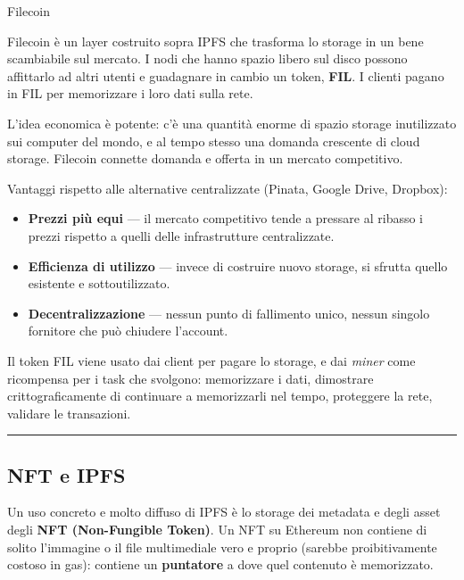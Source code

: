 \documentclass[
  italian,
  openany]{book}
\providecommand{\tightlist}{%
  \setlength{\itemsep}{0pt}\setlength{\parskip}{0pt}}
\begin{document}
\begin{calloutdefinition}{Filecoin}

Filecoin è un layer costruito sopra IPFS che trasforma lo storage in un
bene scambiabile sul mercato. I nodi che hanno spazio libero sul disco
possono affittarlo ad altri utenti e guadagnare in cambio un token,
\textbf{FIL}. I clienti pagano in FIL per memorizzare i loro dati sulla
rete.

\end{calloutdefinition}

L'idea economica è potente: c'è una quantità enorme di spazio storage
inutilizzato sui computer del mondo, e al tempo stesso una domanda
crescente di cloud storage. Filecoin connette domanda e offerta in un
mercato competitivo.

Vantaggi rispetto alle alternative centralizzate (Pinata, Google Drive,
Dropbox):

\begin{itemize}
\tightlist
\item
  \textbf{Prezzi più equi} --- il mercato competitivo tende a pressare
  al ribasso i prezzi rispetto a quelli delle infrastrutture
  centralizzate.
\item
  \textbf{Efficienza di utilizzo} --- invece di costruire nuovo storage,
  si sfrutta quello esistente e sottoutilizzato.
\item
  \textbf{Decentralizzazione} --- nessun punto di fallimento unico,
  nessun singolo fornitore che può chiudere l'account.
\end{itemize}

Il token FIL viene usato dai client per pagare lo storage, e dai
\emph{miner} come ricompensa per i task che svolgono: memorizzare i
dati, dimostrare crittograficamente di continuare a memorizzarli nel
tempo, proteggere la rete, validare le transazioni.

\begin{center}\rule{0.5\linewidth}{0.5pt}\end{center}

\subsection{NFT e IPFS}\label{nft-e-ipfs}

Un uso concreto e molto diffuso di IPFS è lo storage dei metadata e
degli asset degli \textbf{NFT (Non-Fungible Token)}. Un NFT su Ethereum
non contiene di solito l'immagine o il file multimediale vero e proprio
(sarebbe proibitivamente costoso in gas): contiene un \textbf{puntatore}
a dove quel contenuto è memorizzato.
\end{document}
